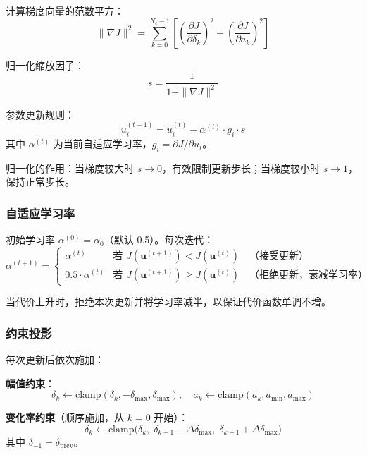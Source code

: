 \documentclass[a4paper,10pt]{article}
\begin{document}
计算梯度向量的范数平方：
\begin{equation}
  \|\nabla J\|^2 = \sum_{k=0}^{N_c-1} \left[ \left(\frac{\partial J}{\partial \delta_k}\right)^2 + \left(\frac{\partial J}{\partial a_k}\right)^2 \right]
\end{equation}

归一化缩放因子：
\begin{equation}
  s = \frac{1}{1 + \|\nabla J\|^2}
\end{equation}

参数更新规则：
\begin{equation}
  u_i^{(t+1)} = u_i^{(t)} - \alpha^{(t)} \cdot g_i \cdot s
\end{equation}
其中 $\alpha^{(t)}$ 为当前自适应学习率，$g_i = \partial J / \partial u_i$。

归一化的作用：当梯度较大时 $s \to 0$，有效限制更新步长；当梯度较小时 $s \to 1$，保持正常步长。

\subsubsection{自适应学习率}

初始学习率 $\alpha^{(0)} = \alpha_0$（默认 0.5）。每次迭代：
\begin{equation}
  \alpha^{(t+1)} =
  \begin{cases}
    \alpha^{(t)} & \text{若 } J(\mathbf{u}^{(t+1)}) < J(\mathbf{u}^{(t)}) \quad \text{（接受更新）} \\
    0.5 \cdot \alpha^{(t)} & \text{若 } J(\mathbf{u}^{(t+1)}) \geq J(\mathbf{u}^{(t)}) \quad \text{（拒绝更新，衰减学习率）}
  \end{cases}
\end{equation}

当代价上升时，拒绝本次更新并将学习率减半，以保证代价函数单调不增。

\subsubsection{约束投影}

每次更新后依次施加：

\textbf{幅值约束}：
\begin{equation}
  \delta_k \leftarrow \text{clamp}(\delta_k, -\delta_{\max}, \delta_{\max}), \quad
  a_k \leftarrow \text{clamp}(a_k, a_{\min}, a_{\max})
\end{equation}

\textbf{变化率约束}（顺序施加，从 $k{=}0$ 开始）：
\begin{equation}
  \delta_k \leftarrow \text{clamp}\!\big(\delta_k,\; \delta_{k-1} - \Delta\delta_{\max},\; \delta_{k-1} + \Delta\delta_{\max}\big)
\end{equation}
其中 $\delta_{-1} = \delta_{\text{prev}}$。
\end{document}

